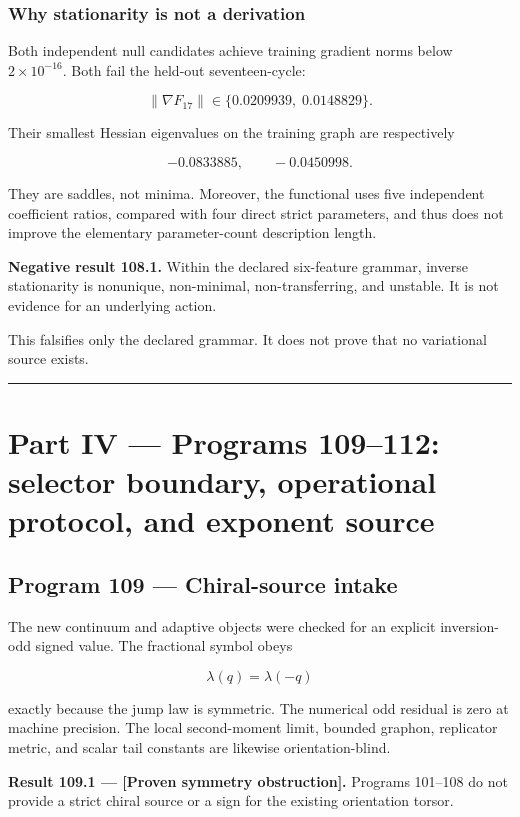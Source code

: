 \documentclass[11pt,a4paper,openany]{report}
\begin{document}
\subsection{Why stationarity is not a derivation}

Both independent null candidates achieve training gradient norms below \(2\times10^{-16}\). Both fail the held-out seventeen-cycle:

\[
\|\nabla F_{17}\|
\in\{0.0209939,\;0.0148829\}.
\]

Their smallest Hessian eigenvalues on the training graph are respectively

\[
-0.0833885,\qquad -0.0450998.
\]

They are saddles, not minima. Moreover, the functional uses five independent coefficient ratios, compared with four direct strict parameters, and thus does not improve the elementary parameter-count description length.

\textbf{Negative result 108.1.} Within the declared six-feature grammar, inverse stationarity is nonunique, non-minimal, non-transferring, and unstable. It is not evidence for an underlying action.

This falsifies only the declared grammar. It does not prove that no variational source exists.

\par\medskip\hrule\medskip

\chapter{Part IV --- Programs 109--112: selector boundary, operational protocol, and exponent source}

\section{Program 109 --- Chiral-source intake}

The new continuum and adaptive objects were checked for an explicit inversion-odd signed value. The fractional symbol obeys

\[
\lambda(q)=\lambda(-q)
\]

exactly because the jump law is symmetric. The numerical odd residual is zero at machine precision. The local second-moment limit, bounded graphon, replicator metric, and scalar tail constants are likewise orientation-blind.

\textbf{Result 109.1 --- [Proven symmetry obstruction].} Programs 101--108 do not provide a strict chiral source or a sign for the existing orientation torsor.
\end{document}
